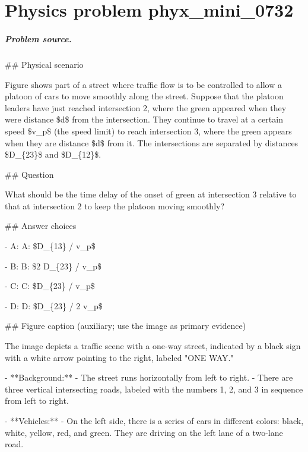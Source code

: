 
\chapter{Physics problem phyx\_mini\_0732}
\label{ch:PhyXMiniProblems_problem_phyx_mini_0732}

\paragraph{Problem source.}
\#\# Physical scenario

Figure shows part of a street where traffic flow is to be controlled to allow a platoon of cars to move smoothly along the street. Suppose that the platoon leaders have just reached intersection 2, where the green appeared when they were distance \$d\$ from the intersection. They continue to travel at a certain speed \$v\_p\$ (the speed limit) to reach intersection 3, where the green appears when they are distance \$d\$ from it. The intersections are separated by distances \$D\_\{23\}\$ and \$D\_\{12\}\$.

\#\# Question

What should be the time delay of the onset of green at intersection 3 relative to that at intersection 2 to keep the platoon moving smoothly?

\#\# Answer choices

- A: A: \$D\_\{13\} / v\_p\$

- B: B: \$2 D\_\{23\} / v\_p\$

- C: C: \$D\_\{23\} / v\_p\$

- D: D: \$D\_\{23\} / 2 v\_p\$

\#\# Figure caption (auxiliary; use the image as primary evidence)

The image depicts a traffic scene with a one-way street, indicated by a black sign with a white arrow pointing to the right, labeled "ONE WAY."

- **Background:**
  - The street runs horizontally from left to right.
  - There are three vertical intersecting roads, labeled with the numbers 1, 2, and 3 in sequence from left to right.

- **Vehicles:**
  - On the left side, there is a series of cars in different colors: black, white, yellow, red, and green. They are driving on the left lane of a two-lane road.

